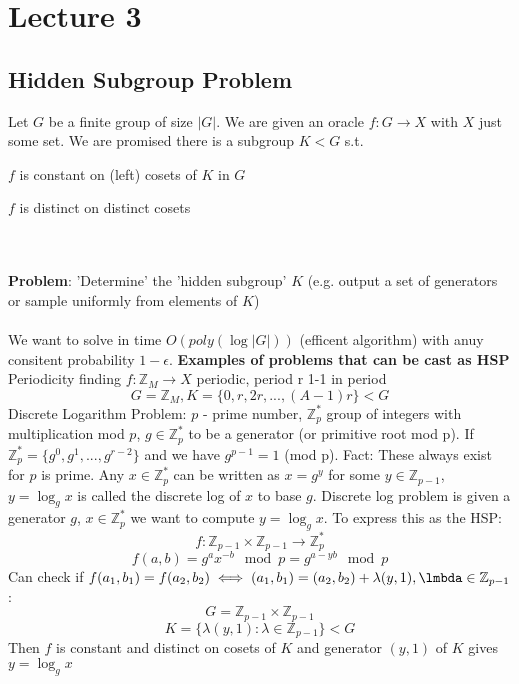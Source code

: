 \documentclass{article}
\begin{document}
\section{Lecture 3}
\subsection{Hidden Subgroup Problem}
Let $G$ be a finite group of size $|G|$. We are given an oracle $f: G \rightarrow X$ with $X$ just some set. We are promised there is a subgroup $K<G$ s.t.
\begin{itemise}
\item $f$ is constant on (left) cosets of $K$ in $G$
\item $f$ is distinct on distinct cosets
\end{itemise}\\\\
\textbf{Problem}: 'Determine' the 'hidden subgroup' $K$ (e.g. output a set of generators or sample uniformly from elements of $K$)\\\\
We want to solve in time $O(poly ( \log |G|))$ (efficent algorithm) with anuy consitent probability $1-\epsilon$.
\textbf{Examples of problems that can be cast as HSP}\\
Periodicity finding $f: \mathbb{Z}_M \rightarrow X$ periodic, period r 1-1 in period
$$
G = \mathbb{Z}_M, K = \{ 0,r,2r,..., (A-1)r\} < G
$$
Discrete Logarithm Problem: $p$ - prime number, $\mathbb{Z}^*_p$ group of integers with multiplication mod $p$, $g \in \mathbb{Z}_p^*$ to be a generator (or primitive root mod p). If $\mathbb{Z}^*_p = \{ g^0, g^1, ..., g^{r-2} \}$ and we have $g^{p-1} = 1$ (mod p). Fact: These always exist for $p$ is prime. Any $x \in \mathbb{Z}_p^*$ can be written as $x = g^y$ for some $y \in \mathbb{Z}_{p-1}$, $y = \log_g x$ is called the discrete log of $x$ to base $g$. Discrete log problem is given a generator $g$, $x \in \mathbb{Z}^*_p$ we want to compute $y = \log_g x$. To express this as the HSP:
$$
f: \mathbb{Z}_{p-1} \times \mathbb{Z}_{p-1} \rightarrow \mathbb{Z}_p^*
$$
$$
f(a,b) = g^a x^{-b} \mod p = g^{a-yb} \mod p
$$
Can check if $f(a_1, b_1) = f(a_2, b_2) \iff (a_1, b_1) = (a_2, b_2) + \lambda( y, 1), \lmbda \in \mathbb{Z}_{p-1}$:
$$
G = \mathbb{Z}_{p-1} \times \mathbb{Z}_{p-1}
$$
$$
K = \{ \lambda(y,1): \lambda \in \mathbb{Z}_{p-1} \} < G
$$
Then $f$ is constant and distinct on cosets of $K$ and generator $(y,1)$ of $K$ gives $y = \log_g x$\\\\
\end{document}
